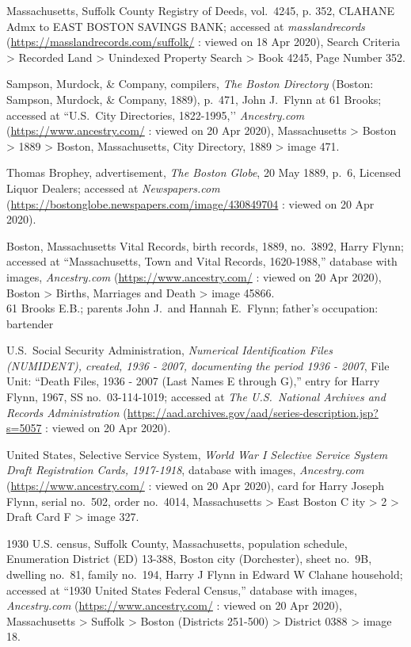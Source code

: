 \begin{thebibliography}{999}
	Massachusetts, Suffolk County Registry of Deeds, vol.\ 4245, p. 352, CLAHANE Admx to EAST BOSTON SAVINGS BANK; accessed at \textit{masslandrecords} (\url{https://masslandrecords.com/suffolk/} : viewed on 18 Apr 2020), Search Criteria > Recorded Land > Unindexed Property Search > Book 4245, Page Number 352.
	
	Sampson, Murdock, \& Company, compilers, \textit{The Boston Directory} (Boston: Sampson, Murdock, \& Company, 1889), p.\ 471, John J.\ Flynn at 61 Brooks; accessed at ``U.S.\ City Directories, 1822-1995,’’ \textit{Ancestry.com} (\url{https://www.ancestry.com/} : viewed on 20 Apr 2020), Massachusetts > Boston > 1889 > Boston, Massachusetts, City Directory, 1889 > image 471.
	
	Thomas Brophey, advertisement, \textit{The Boston Globe}, 20 May 1889, p.\ 6, Licensed Liquor Dealers; accessed at \textit{Newspapers.com} (\url{https://bostonglobe.newspapers.com/image/430849704} : viewed on 20 Apr 2020).
	
	Boston, Massachusetts Vital Records, birth records, 1889, no.\ 3892, Harry Flynn; accessed at ``Massachusetts, Town and Vital Records, 1620-1988,'' database with images, \textit{Ancestry.com} (\url{https://www.ancestry.com/} : viewed on 20 Apr 2020), Boston > Births, Marriages and Death > image 45866.\\
	61 Brooks E.B.; parents John J.\ and Hannah E.\ Flynn; father's occupation: bartender
	
	U.S.\ Social Security Administration, \textit{Numerical Identification Files (NUMIDENT), created, 1936 - 2007, documenting the period 1936 - 2007}, File Unit: ``Death Files, 1936 - 2007 (Last Names E through G),'' entry for Harry Flynn, 1967,  SS no.\ 03-114-1019; accessed at \textit{The U.S.\ National Archives and Records Administration} (\url{https://aad.archives.gov/aad/series-description.jsp?s=5057} : viewed on 20 Apr 2020).
	
	United States, Selective Service System, \textit{World War I Selective Service System Draft Registration Cards, 1917-1918}, database with images, \textit{Ancestry.com} (\url{https://www.ancestry.com/} : viewed on 20 Apr 2020), card for Harry Joseph Flynn, serial no.\ 502, order no.\ 4014, Massachusetts > East Boston C ity > 2 > Draft Card F > image 327.
	
	1930 U.S. census, Suffolk County, Massachusetts, population schedule, Enumeration District (ED) 13-388, Boston city (Dorchester), sheet no.\ 9B, dwelling no.\ 81, family no.\ 194, Harry J Flynn in Edward W Clahane household; accessed at ``1930 United States Federal Census,'' database with images, \textit{Ancestry.com} (\url{https://www.ancestry.com/} : viewed on 20 Apr 2020), Massachusetts > Suffolk > Boston (Districts 251-500) > District 0388 > image 18.
	

\end{thebibliography}
